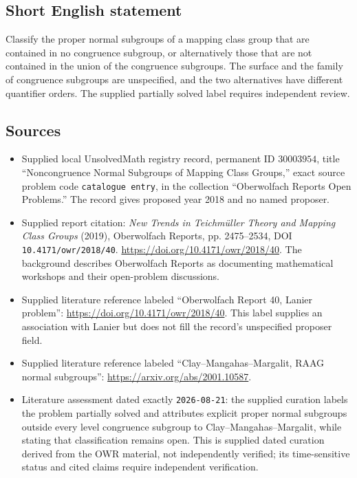 \documentclass[11pt]{article}
\begin{document}
\subsection{Short English statement}
Classify the proper normal subgroups of a mapping class group that are contained in no congruence subgroup, or alternatively those that are not contained in the union of the congruence subgroups. The surface and the family of congruence subgroups are unspecified, and the two alternatives have different quantifier orders. The supplied partially solved label requires independent review.
\subsection{Sources}
\begin{itemize}
\item Supplied local UnsolvedMath registry record, permanent ID \(30003954\), title ``Noncongruence Normal Subgroups of Mapping Class Groups,'' exact source problem code \texttt{catalogue entry}, in the collection ``Oberwolfach Reports Open Problems.'' The record gives proposed year 2018 and no named proposer.
\item Supplied report citation: \emph{New Trends in Teichmüller Theory and Mapping Class Groups} (2019), Oberwolfach Reports, pp. 2475--2534, DOI \texttt{10.4171/owr/2018/40}. \url{https://doi.org/10.4171/owr/2018/40}. The background describes Oberwolfach Reports as documenting mathematical workshops and their open-problem discussions.
\item Supplied literature reference labeled ``Oberwolfach Report 40, Lanier problem'': \url{https://doi.org/10.4171/owr/2018/40}. This label supplies an association with Lanier but does not fill the record's unspecified proposer field.
\item Supplied literature reference labeled ``Clay--Mangahas--Margalit, RAAG normal subgroups'': \url{https://arxiv.org/abs/2001.10587}.
\item Literature assessment dated exactly \texttt{2026-08-21}: the supplied curation labels the problem partially solved and attributes explicit proper normal subgroups outside every level congruence subgroup to Clay--Mangahas--Margalit, while stating that classification remains open. This is supplied dated curation derived from the OWR material, not independently verified; its time-sensitive status and cited claims require independent verification.
\end{itemize}
\end{document}
